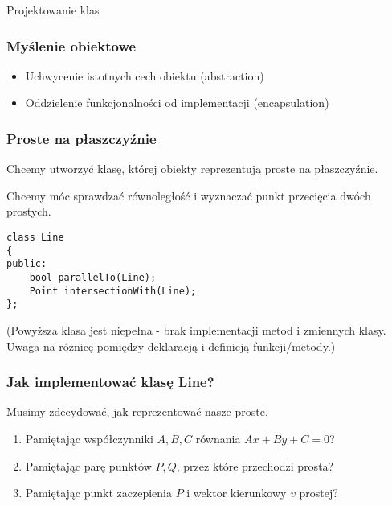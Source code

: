 \documentclass[pdftex, smaller]{beamer}
\begin{document}
\begin{frame}

\begin{center}
\Large Projektowanie klas
\end{center}
\end{frame}

\begin{frame}
\frametitle{Myślenie obiektowe}

\begin{itemize}
\item Uchwycenie istotnych cech obiektu (abstraction)

\vspace{8mm}
\item Oddzielenie funkcjonalności od implementacji (encapsulation)
\end{itemize}

\end{frame}

\begin{frame}[fragile]
\frametitle{Proste na płaszczyźnie}

Chcemy utworzyć klasę, której obiekty reprezentują proste na płaszczyźnie.

\vspace{2mm}
Chcemy móc sprawdzać równoległość i wyznaczać punkt przecięcia dwóch prostych.

\vspace{2mm}
\begin{lstlisting}
class Line
{
public:
	bool parallelTo(Line);
	Point intersectionWith(Line);
};
\end{lstlisting}

(Powyższa klasa jest niepełna - brak implementacji metod i zmiennych klasy. Uwaga na różnicę pomiędzy deklaracją i definicją funkcji/metody.)
\end{frame}

\begin{frame}
\frametitle{Jak implementować klasę Line?}

Musimy zdecydować, jak reprezentować nasze proste.
\vspace{6mm}

\begin{enumerate}
\item Pamiętając współczynniki $A, B, C$ równania $Ax + By + C = 0$?

\vspace{4mm}
\item Pamiętając parę punktów $P, Q$, przez które przechodzi prosta?

\vspace{4mm}
\item Pamiętając punkt zaczepienia $P$ i wektor kierunkowy $v$ prostej?
\end{enumerate}

\end{frame}
\end{document}
